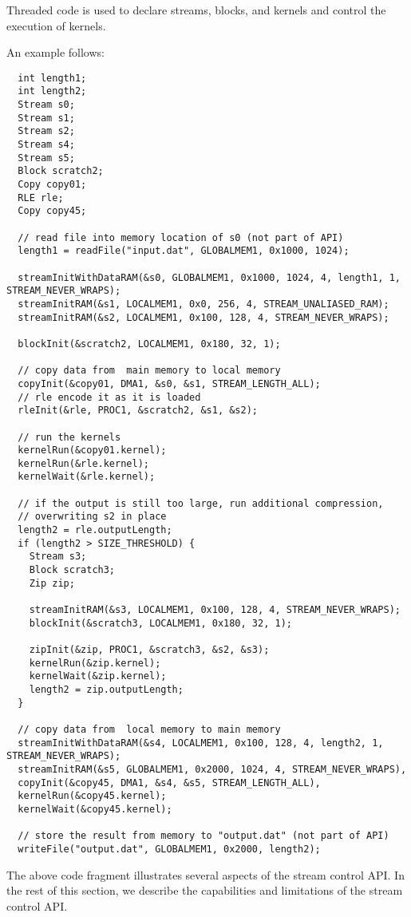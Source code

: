 Threaded code is used to declare streams, blocks, and kernels and control the execution of kernels.

An example follows:
{\small
\begin{verbatim}
  int length1;
  int length2;
  Stream s0;
  Stream s1;
  Stream s2;
  Stream s4;
  Stream s5;
  Block scratch2;
  Copy copy01;
  RLE rle;
  Copy copy45;

  // read file into memory location of s0 (not part of API)
  length1 = readFile("input.dat", GLOBALMEM1, 0x1000, 1024);

  streamInitWithDataRAM(&s0, GLOBALMEM1, 0x1000, 1024, 4, length1, 1, STREAM_NEVER_WRAPS);
  streamInitRAM(&s1, LOCALMEM1, 0x0, 256, 4, STREAM_UNALIASED_RAM);
  streamInitRAM(&s2, LOCALMEM1, 0x100, 128, 4, STREAM_NEVER_WRAPS);
  
  blockInit(&scratch2, LOCALMEM1, 0x180, 32, 1);

  // copy data from  main memory to local memory
  copyInit(&copy01, DMA1, &s0, &s1, STREAM_LENGTH_ALL);
  // rle encode it as it is loaded
  rleInit(&rle, PROC1, &scratch2, &s1, &s2);

  // run the kernels
  kernelRun(&copy01.kernel);
  kernelRun(&rle.kernel);
  kernelWait(&rle.kernel);

  // if the output is still too large, run additional compression, 
  // overwriting s2 in place
  length2 = rle.outputLength;
  if (length2 > SIZE_THRESHOLD) {
    Stream s3;
    Block scratch3;
    Zip zip;

    streamInitRAM(&s3, LOCALMEM1, 0x100, 128, 4, STREAM_NEVER_WRAPS);
    blockInit(&scratch3, LOCALMEM1, 0x180, 32, 1);
    
    zipInit(&zip, PROC1, &scratch3, &s2, &s3);
    kernelRun(&zip.kernel);
    kernelWait(&zip.kernel);
    length2 = zip.outputLength;
  }
  
  // copy data from  local memory to main memory
  streamInitWithDataRAM(&s4, LOCALMEM1, 0x100, 128, 4, length2, 1, STREAM_NEVER_WRAPS);
  streamInitRAM(&s5, GLOBALMEM1, 0x2000, 1024, 4, STREAM_NEVER_WRAPS),
  copyInit(&copy45, DMA1, &s4, &s5, STREAM_LENGTH_ALL),
  kernelRun(&copy45.kernel);
  kernelWait(&copy45.kernel);

  // store the result from memory to "output.dat" (not part of API)
  writeFile("output.dat", GLOBALMEM1, 0x2000, length2); \end{verbatim}}

The above code fragment illustrates several aspects of the stream control API.  In the rest of this section, we describe the 
capabilities and limitations of the stream control API.

